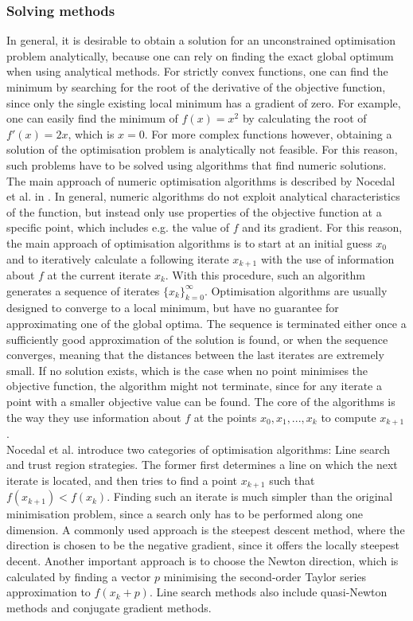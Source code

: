 \subsubsection{Solving methods}
In general, it is desirable to obtain a solution for an unconstrained optimisation problem analytically, because one can rely on finding the exact global optimum when using analytical methods. For strictly convex functions, one can find the minimum by searching for the root of the derivative of the objective function, since only the single existing local minimum has a gradient of zero. For example, one can easily find the minimum of $f(x) = x^2$ by calculating the root of $f'(x) = 2x$, which is $x = 0$. For more complex functions however, obtaining a solution of the optimisation problem is analytically not feasible. For this reason, such problems have to be solved using algorithms that find numeric solutions. The main approach of numeric optimisation algorithms is described by Nocedal et al. in \cite{NoceWrig06}. In general, numeric algorithms do not exploit analytical characteristics of the function, but instead only use properties of the objective function at a specific point, which includes e.g. the value of $f$ and its gradient. For this reason, the main approach of optimisation algorithms is to start at an initial guess $x_0$ and to iteratively calculate a following iterate $x_{k+1}$ with the use of information about $f$ at the current iterate $x_k$. With this procedure, such an algorithm generates a sequence of iterates $\{x_k\}_{k=0}^\infty$. Optimisation algorithms are usually designed to converge to a local minimum, but have no guarantee for approximating one of the global optima. The sequence is terminated either once a sufficiently good approximation of the solution is found, or when the sequence converges, meaning that the distances between the last iterates are extremely small. If no solution exists, which is the case when no point minimises the objective function, the algorithm might not terminate, since for any iterate a point with a smaller objective value can be found. The core of the algorithms is the way they use information about $f$ at the points $x_0, x_1, ..., x_k$ to compute $x_{k+1}$. \\
\indent Nocedal et al. introduce two categories of optimisation algorithms: Line search and trust region strategies. The former first determines a line on which the next iterate is located, and then tries to find a point $x_{k+1}$ such that $f(x_{k+1}) < f(x_k)$. Finding such an iterate is much simpler than the original minimisation problem, since a search only has to be performed along one dimension. A commonly used approach is the steepest descent method, where the direction is chosen to be the negative gradient, since it offers the locally steepest decent. Another important approach is to choose the Newton direction, which is calculated by finding a vector $p$ minimising the second-order Taylor series approximation to $f(x_k + p)$. Line search methods also include quasi-Newton methods and conjugate gradient methods.\\ 
